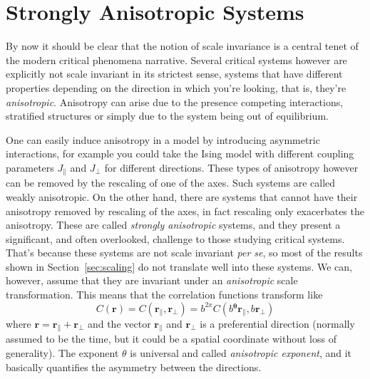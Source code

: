 \section{Strongly Anisotropic Systems}
\label{ch:anis}

By now it should be clear that the notion of scale invariance is a central
tenet of the modern critical phenomena narrative. Several critical systems
however are explicitly not scale invariant in its strictest sense, systems that
have different properties depending on the direction in which you're looking,
that is, they're \textit{anisotropic}. Anisotropy can arise due to the presence
competing interactions, stratified structures or simply due to the system being
out of equilibrium.

One can easily induce anisotropy in a model by introducing asymmetric
interactions, for example you could take the Ising model with different
coupling parameters $J_\parallel$ and $J_\perp$ for different directions. These
types of anisotropy however can be removed by the rescaling of one of the axes.
Such systems are called weakly anisotropic. On the other hand, there are
systems that cannot have their anisotropy removed by rescaling of the axes, in
fact rescaling only exacerbates the anisotropy. These are called
\textit{strongly anisotropic} systems, and they present a significant, and
often overlooked, challenge to those studying critical systems. That's because
these systems are not scale invariant \textit{per se}, so most of the results
shown in Section~\ref{sec:scaling} do not translate well into these systems.
We can, however, assume that they are invariant under an \textit{anisotropic}
scale transformation. This means that the correlation functions transform like
\begin{equation}
    C\left(\mathbf{r}\right)=
    C\left(\mathbf{r}_{\parallel},\mathbf{r}_{\perp}\right)=
    b^{2x}C\left(b\mathbf{^{\theta}r}_{\parallel},b\mathbf{r}_{\perp}\right)
\end{equation}
where $\mathbf{r}=\mathbf{r}_{\parallel}+\mathbf{r}_{\perp}$ and the vector
$\mathbf{r}_{\parallel}$ and $\mathbf{r}_{\perp}$
is a preferential direction (normally assumed to be the time, but it could be a
spatial coordinate without loss of generality). The exponent $\theta$ is
universal and called \textit{anisotropic exponent}, and it basically quantifies
the asymmetry between the directions.

